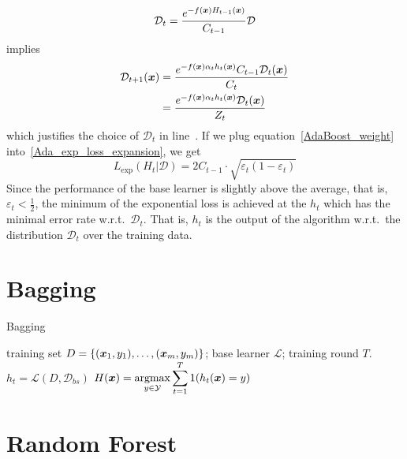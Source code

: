 $$\mathcal{D}_t = \frac{e^{-f(\boldsymbol{x})H_{t-1}(\boldsymbol{x})}}{C_{t-1}} \mathcal{D}$$
implies
\begin{align}
\mathcal{D}_{t+1}(\boldsymbol{x}) &= \frac{e^{-f(\boldsymbol{x})\alpha_t h_t(\boldsymbol{x})}C_{t-1}\mathcal{D}_t(\boldsymbol{x})}{C_t}\nonumber\\
                         &= \frac{e^{-f(\boldsymbol{x})\alpha_t h_t(\boldsymbol{x})}\mathcal{D}_t(\boldsymbol{x})}{Z_t}
\end{align}
which justifies the choice of $\mathcal{D}_t$ in line~. If we plug
equation~\eqref{AdaBoost_weight} into~\eqref{Ada_exp_loss_expansion}, we get
$$L_{\exp}(H_t | \mathcal{D}) = 2C_{t-1}\cdot\sqrt{\varepsilon_t (1-\varepsilon_t)}$$
Since the performance of the base learner is slightly above the average, that is, 
$\varepsilon_t < \frac{1}{2}$, the minimum of the exponential loss is achieved at the $h_t$ which has 
the minimal error rate w.r.t.\ $\mathcal{D}_t$. That is, $h_t$ is the output of the algorithm w.r.t.\ the 
distribution $\mathcal{D}_t$ over the training data.


\section{Bagging}

\begin{algorithm}
    \caption{Bagging}\label{Bagging}
    \begin{algorithmic}[1]
        \Require training set $D = \{(\boldsymbol{x}_1, y_1), \dotsc, (\boldsymbol{x}_m, y_m)\}$; base learner $\mathcal{L}$;
        training round $T$.
            \State $h_t = \mathcal{L}(D, \mathcal{D}_{bs})$ 
        \EndFor
        \Ensure $H(\boldsymbol{x}) = \displaystyle\operatorname*{argmax}_{y\in \mathcal{Y}}\sum_{t=1}^T 1(h_t(\boldsymbol{x}) = y)$
    \end{algorithmic}
\end{algorithm}

\section{Random Forest}

% 